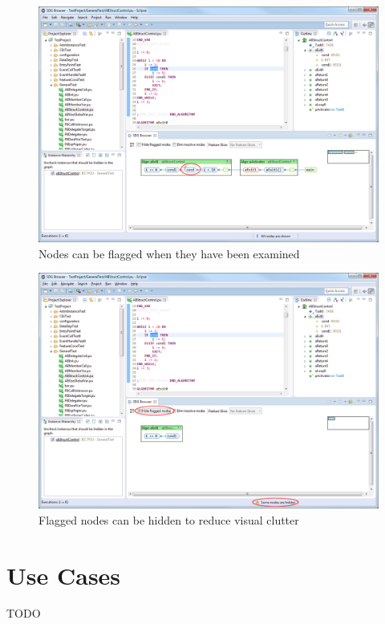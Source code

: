 \begin{figure}[hp]
  \centering
    \includegraphics[width=\textwidth]{bilder/manual-flag}
  \caption{Nodes can be flagged when they have been examined}
  \label{fig:manual-flag}
\end{figure}

\begin{figure}[hp]
  \centering
    \includegraphics[width=\textwidth]{bilder/manual-hide_flagged}
  \caption{Flagged nodes can be hidden to reduce visual clutter}
  \label{fig:manual-hide_flagged}
\end{figure}


\section{Use Cases} \label{sec:manual-usecases}

TODO
